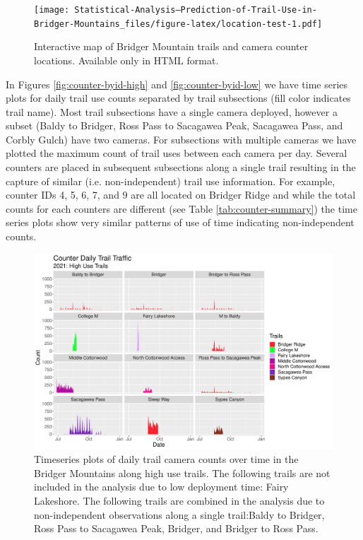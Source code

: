 \documentclass[
]{book}
\begin{document}
\begin{figure}
\centering
\texttt{[image: Statistical-Analysis--Prediction-of-Trail-Use-in-Bridger-Mountains\_files/figure-latex/location-test-1.pdf]}
\caption{\label{fig:location-test}Interactive map of Bridger Mountain trails and camera counter locations. Available only in HTML format.}
\end{figure}

In Figures \autoref{fig:counter-byid-high} and
\ref{fig:counter-byid-low} we have time series plots for daily trail
use counts separated by trail subsections (fill color indicates trail
name). Most trail subsections have a single camera deployed, however a
subset (Baldy to Bridger, Ross Pass to Sacagawea Peak, Sacagawea Pass,
and Corbly Gulch) have two cameras. For subsections with multiple
cameras we have plotted the maximum count of trail uses between each
camera per day. Several counters are placed in subsequent subsections
along a single trail resulting in the capture of similar (i.e.
non-independent) trail use information. For example, counter IDs 4, 5,
6, 7, and 9 are all located on Bridger Ridge and while the total counts
for each counters are different (see Table \ref{tab:counter-summary})
the time series plots show very similar patterns of use of time
indicating non-independent counts.

\begin{figure}

{\centering \includegraphics[width=1\linewidth]{../figures/Counter_bySubSection_TS_highuse} 

}

\caption{Timeseries plots of daily trail camera counts over time in the Bridger Mountains along high use trails. The following trails are not included in the analysis due to low deployment time:  Fairy Lakeshore. The following trails are combined in the analysis due to non-independent observations along a single trail:Baldy to Bridger, Ross Pass to Sacagawea Peak, Bridger, and Bridger to Ross Pass.}\label{fig:counter-byid-high}
\end{figure}
\end{document}
